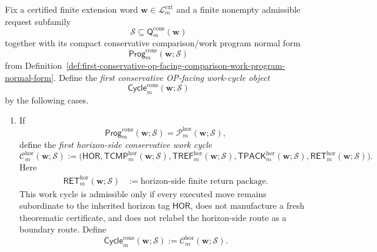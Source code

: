 \begin{definition}
\label{def:first-conservative-op-facing-program-to-execution-work-cycle-layer}
Fix a certified finite extension word \(\mathbf w\in\mathcal L^{\mathrm{ext}}_{m}\) and a finite nonempty admissible request subfamily
\[
 \mathcal S \subseteq \mathsf{Q}^{\mathrm{cons}}_{m}(\mathbf w)
\]
together with its compact conservative comparison/work program normal form
\[
 \mathsf{Prog}^{\mathrm{cons}}_{m}(\mathbf w;\mathcal S)
\]
from Definition~\ref{def:first-conservative-op-facing-comparison-work-program-normal-form}. Define the \emph{first conservative OP-facing work-cycle object}
\[
 \mathsf{Cycle}^{\mathrm{cons}}_{m}(\mathbf w;\mathcal S)
\]
by the following cases.
\begin{enumerate}[label=(\roman*)]
 \item If
 \[
 \mathsf{Prog}^{\mathrm{cons}}_{m}(\mathbf w;\mathcal S)
 =
 \mathcal P^{\mathrm{hor}}_{m}(\mathbf w;\mathcal S),
 \]
define the \emph{first horizon-side conservative work cycle}
{\small
\[
 \mathcal C^{\mathrm{hor}}_{m}(\mathbf w;\mathcal S)
 :=
 \bigl(
 \mathsf{HOR},
 \mathsf{TCMP}^{\mathrm{hor}}_{m}(\mathbf w;\mathcal S),
 \mathsf{TREF}^{\mathrm{hor}}_{m}(\mathbf w;\mathcal S),
 \mathsf{TPACK}^{\mathrm{hor}}_{m}(\mathbf w;\mathcal S),
 \mathsf{RET}^{\mathrm{hor}}_{m}(\mathbf w;\mathcal S)
 \bigr).
\]
}
Here
\begin{align*}
 \mathsf{RET}^{\mathrm{hor}}_{m}(\mathbf w;\mathcal S)
 &:= \text{horizon-side finite return package}.
\end{align*}
This work cycle is admissible only if every executed move remains subordinate to the inherited horizon tag \(\mathsf{HOR}\), does not manufacture a fresh theorematic certificate, and does not relabel the horizon-side route as a boundary route. Define
{\small
\[
 \mathsf{Cycle}^{\mathrm{cons}}_{m}(\mathbf w;\mathcal S)
 :=
 \mathcal C^{\mathrm{hor}}_{m}(\mathbf w;\mathcal S).
\]
}


\end{enumerate}
\end{definition}
